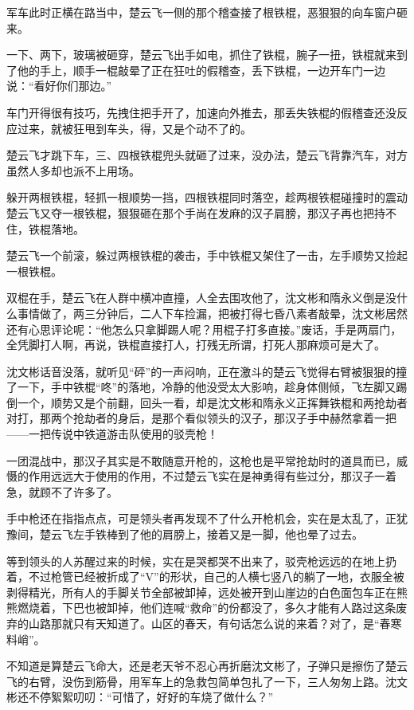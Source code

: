 军车此时正横在路当中，楚云飞一侧的那个稽查接了根铁棍，恶狠狠的向车窗户砸来。

一下、两下，玻璃被砸穿，楚云飞出手如电，抓住了铁棍，腕子一扭，铁棍就来到了他的手上，顺手一棍敲晕了正在狂吐的假稽查，丢下铁棍，一边开车门一边说：“看好你们那边。”

车门开得很有技巧，先拽住把手开了，加速向外推去，那丢失铁棍的假稽查还没反应过来，就被狂甩到车头，得，又是个动不了的。

楚云飞才跳下车，三、四根铁棍兜头就砸了过来，没办法，楚云飞背靠汽车，对方虽然人多却也派不上用场。

躲开两根铁棍，轻抓一根顺势一挡，四根铁棍同时落空，趁两根铁棍碰撞时的震动楚云飞又夺一根铁棍，狠狠砸在那个手尚在发麻的汉子肩膀，那汉子再也把持不住，铁棍落地。

楚云飞一个前滚，躲过两根铁棍的袭击，手中铁棍又架住了一击，左手顺势又捡起一根铁棍。

双棍在手，楚云飞在人群中横冲直撞，人全去围攻他了，沈文彬和隋永义倒是没什么事情做了，两三分钟后，二人下车捡漏，把被打得七昏八素者敲晕，沈文彬居然还有心思评论呢：“他怎么只拿脚踢人呢？用棍子打多直接。”废话，手是两扇门，全凭脚打人啊，再说，铁棍直接打人，打残无所谓，打死人那麻烦可是大了。

沈文彬话音没落，就听见“砰”的一声闷响，正在激斗的楚云飞觉得右臂被狠狠的撞了一下，手中铁棍“咚”的落地，冷静的他没受太大影响，趁身体侧倾，飞左脚又踢倒一个，顺势又是个前翻，回头一看，却是沈文彬和隋永义正挥舞铁棍和两抢劫者对打，那两个抢劫者的身后，是那个看似领头的汉子，那汉子手中赫然拿着一把——一把传说中铁道游击队使用的驳壳枪！

一团混战中，那汉子其实是不敢随意开枪的，这枪也是平常抢劫时的道具而已，威慑的作用远远大于使用的作用，不过楚云飞实在是神勇得有些过分，那汉子一着急，就顾不了许多了。

手中枪还在指指点点，可是领头者再发现不了什么开枪机会，实在是太乱了，正犹豫间，楚云飞左手铁棒到了他的肩膀上，接着又是一脚，他也晕了过去。

等到领头的人苏醒过来的时候，实在是哭都哭不出来了，驳壳枪远远的在地上扔着，不过枪管已经被折成了“V”的形状，自己的人横七竖八的躺了一地，衣服全被剥得精光，所有人的手脚关节全部被卸掉，远处被开到山崖边的白色面包车正在熊熊燃烧着，下巴也被卸掉，他们连喊“救命”的份都没了，多久才能有人路过这条废弃的山路那就只有天知道了。山区的春天，有句话怎么说的来着？对了，是“春寒料峭”。

不知道是算楚云飞命大，还是老天爷不忍心再折磨沈文彬了，子弹只是擦伤了楚云飞的右臂，没伤到筋骨，用军车上的急救包简单包扎了一下，三人匆匆上路。沈文彬还不停絮絮叨叨：“可惜了，好好的车烧了做什么？”

